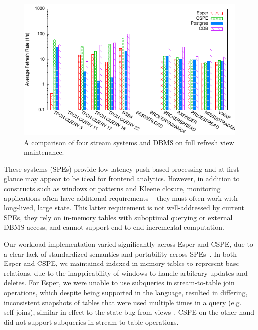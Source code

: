 \begin{figure}[t]
\vspace{-3mm}
\begin{center}
\includegraphics[scale=0.85]{../graphs/graphs/engine_bakeoff.pdf}
\end{center}
\vspace{-8mm}
\caption{A comparison of four stream systems and DBMS on full refresh view
maintenance.}
\label{fig:enginecomp}
\vspace{-4mm}
\end{figure}


\vspace{1mm}
These systems (SPEs) provide low-latency push-based processing and at first
glance may appear to be ideal for frontend analytics. However, in addition to
constructs such as windows or patterns and Kleene closure, monitoring
applications often have additional requirements -- they must often work with
long-lived, large state. This latter requirement is not well-addressed by
current SPEs, they rely on in-memory tables with suboptimal querying or
external DBMS access, and cannot support end-to-end incremental computation.

Our workload implementation varied significantly across Esper and CSPE, due to a
clear lack of standardized semantics and portability across
SPEs~\cite{botan-pvldb:10,jain-pvldb:08}.
In both Esper and CSPE, we maintained indexed in-memory tables to represent base
relations, due to the inapplicability of windows to handle arbitrary updates and
deletes.
For Esper, we were unable to use subqueries in stream-to-table join operations,
which despite being supported in the language, resulted in differing,
inconsistent snapshots of tables that were used multiple times in a query (e.g.
self-joins), similar in effect to the state bug from
views~\cite{colby-sigmod:96}.
CSPE on the other hand did not support subqueries in stream-to-table operations.

